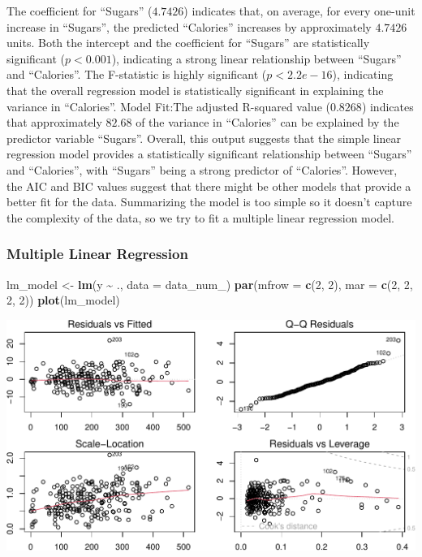 \documentclass[
]{article}
\newenvironment{Shaded}{\begin{snugshade}}{\end{snugshade}}
\newcommand{\AttributeTok}[1]{\textcolor[rgb]{0.13,0.29,0.53}{#1}}
\newcommand{\DecValTok}[1]{\textcolor[rgb]{0.00,0.00,0.81}{#1}}
\newcommand{\FunctionTok}[1]{\textcolor[rgb]{0.13,0.29,0.53}{\textbf{#1}}}
\newcommand{\NormalTok}[1]{#1}
\newcommand{\OtherTok}[1]{\textcolor[rgb]{0.56,0.35,0.01}{#1}}
\newcommand{\SpecialCharTok}[1]{\textcolor[rgb]{0.81,0.36,0.00}{\textbf{#1}}}
\begin{document}
The coefficient for ``Sugars'' (\(4.7426\)) indicates that, on average,
for every one-unit increase in ``Sugars'', the predicted ``Calories''
increases by approximately \(4.7426\) units. Both the intercept and the
coefficient for ``Sugars'' are statistically significant
(\(p < 0.001\)), indicating a strong linear relationship between
``Sugars'' and ``Calories''. The F-statistic is highly significant
(\(p < 2.2e-16\)), indicating that the overall regression model is
statistically significant in explaining the variance in ``Calories''.
Model Fit:The adjusted R-squared value (\(0.8268\)) indicates that
approximately \(82.68%
\) of the variance in ``Calories'' can be explained by the predictor
variable ``Sugars''. Overall, this output suggests that the simple
linear regression model provides a statistically significant
relationship between ``Sugars'' and ``Calories'', with ``Sugars'' being
a strong predictor of ``Calories''. However, the AIC and BIC values
suggest that there might be other models that provide a better fit for
the data. Summarizing the model is too simple so it doesn't capture the
complexity of the data, so we try to fit a multiple linear regression
model.

\subsubsection{Multiple Linear
Regression}\label{multiple-linear-regression}

\begin{Shaded}
\begin{Highlighting}[]
\NormalTok{lm\_model }\OtherTok{\textless{}{-}} \FunctionTok{lm}\NormalTok{(y }\SpecialCharTok{\textasciitilde{}}\NormalTok{ ., }\AttributeTok{data =}\NormalTok{ data\_num\_)}
\FunctionTok{par}\NormalTok{(}\AttributeTok{mfrow =} \FunctionTok{c}\NormalTok{(}\DecValTok{2}\NormalTok{, }\DecValTok{2}\NormalTok{), }\AttributeTok{mar =} \FunctionTok{c}\NormalTok{(}\DecValTok{2}\NormalTok{, }\DecValTok{2}\NormalTok{, }\DecValTok{2}\NormalTok{, }\DecValTok{2}\NormalTok{))}
\FunctionTok{plot}\NormalTok{(lm\_model)}
\end{Highlighting}
\end{Shaded}

\begin{center}\includegraphics{Statistical_Learning_Final_Report_files/figure-latex/linear_regression-1} \end{center}
\end{document}
